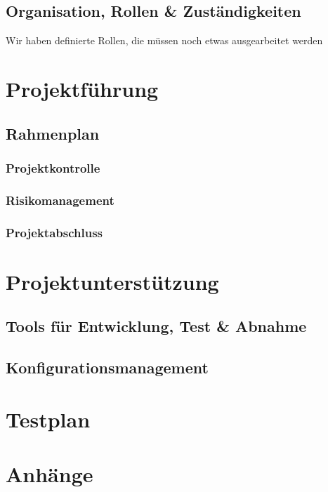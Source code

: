 \documentclass[a4paper, 10pt, fleqn]{article}
\begin{document}
\subsection{Organisation, Rollen \& Zuständigkeiten}
Wir haben definierte Rollen, die müssen noch etwas ausgearbeitet werden
\section{Projektführung}
\subsection{Rahmenplan}
\subsubsection{Projektkontrolle}

\subsubsection{Risikomanagement}

\subsubsection{Projektabschluss}

\section{Projektunterstützung}
\subsection{Tools für Entwicklung, Test \& Abnahme}

\subsection{Konfigurationsmanagement}

\section{Testplan}


\section{Anhänge}
\end{document}
